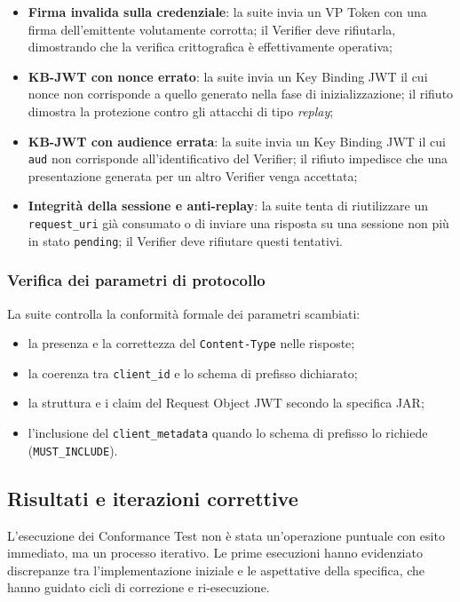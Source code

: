 \begin{itemize}
    \item \textbf{Firma invalida sulla credenziale}: la suite invia un VP Token con una firma dell'emittente volutamente corrotta; il Verifier deve rifiutarla, dimostrando che la verifica crittografica è effettivamente operativa;
    \item \textbf{KB-JWT con nonce errato}: la suite invia un Key Binding JWT il cui nonce non corrisponde a quello generato nella fase di inizializzazione; il rifiuto dimostra la protezione contro gli attacchi di tipo \textit{replay};
    \item \textbf{KB-JWT con audience errata}: la suite invia un Key Binding JWT il cui \texttt{aud} non corrisponde all'identificativo del Verifier; il rifiuto impedisce che una presentazione generata per un altro Verifier venga accettata;
    \item \textbf{Integrità della sessione e anti-replay}: la suite tenta di riutilizzare un \texttt{request\_\allowbreak{}uri} già consumato o di inviare una risposta su una sessione non più in stato \texttt{pending}; il Verifier deve rifiutare questi tentativi.
\end{itemize}

\subsubsection{Verifica dei parametri di protocollo}
La suite controlla la conformità formale dei parametri scambiati:

\begin{itemize}
    \item la presenza e la correttezza del \texttt{Content-\allowbreak{}Type} nelle risposte;
    \item la coerenza tra \texttt{client\_\allowbreak{}id} e lo schema di prefisso dichiarato;
    \item la struttura e i claim del Request Object JWT secondo la specifica JAR;
    \item l'inclusione del \texttt{client\_\allowbreak{}metadata} quando lo schema di prefisso lo richiede (\texttt{MUST\_\allowbreak{}INCLUDE}).
\end{itemize}

\subsection{Risultati e iterazioni correttive}
L'esecuzione dei Conformance Test non è stata un'operazione puntuale con esito immediato, ma un processo iterativo. Le prime esecuzioni hanno evidenziato discrepanze tra l'implementazione iniziale e le aspettative della specifica, che hanno guidato cicli di correzione e ri-esecuzione.

